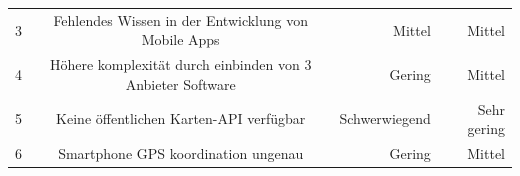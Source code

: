 \documentclass[a4paper,10pt,xetex]{article}
\begin{document}
\begin{longtable}[]{@{}rcrr@{}}
\begin{minipage}[t]{0.06\columnwidth}
3\strut
\end{minipage} & \begin{minipage}[t]{0.50\columnwidth}\centering\strut
Fehlendes Wissen in der Entwicklung von Mobile Apps\strut
\end{minipage} & \begin{minipage}[t]{0.14\columnwidth}\raggedleft\strut
Mittel\strut
\end{minipage} & \begin{minipage}[t]{0.19\columnwidth}\raggedleft\strut
Mittel\strut
\end{minipage}\tabularnewline
\begin{minipage}[t]{0.06\columnwidth}\raggedleft\strut
4\strut
\end{minipage} & \begin{minipage}[t]{0.50\columnwidth}\centering\strut
Höhere komplexität durch einbinden von 3 Anbieter Software\strut
\end{minipage} & \begin{minipage}[t]{0.14\columnwidth}\raggedleft\strut
Gering\strut
\end{minipage} & \begin{minipage}[t]{0.19\columnwidth}\raggedleft\strut
Mittel\strut
\end{minipage}\tabularnewline
\begin{minipage}[t]{0.06\columnwidth}\raggedleft\strut
5\strut
\end{minipage} & \begin{minipage}[t]{0.50\columnwidth}\centering\strut
Keine öffentlichen Karten-API verfügbar\strut
\end{minipage} & \begin{minipage}[t]{0.14\columnwidth}\raggedleft\strut
Schwerwiegend\strut
\end{minipage} & \begin{minipage}[t]{0.19\columnwidth}\raggedleft\strut
Sehr gering\strut
\end{minipage}\tabularnewline
\begin{minipage}[t]{0.06\columnwidth}\raggedleft\strut
6\strut
\end{minipage} & \begin{minipage}[t]{0.50\columnwidth}\centering\strut
Smartphone GPS koordination ungenau\strut
\end{minipage} & \begin{minipage}[t]{0.14\columnwidth}\raggedleft\strut
Gering\strut
\end{minipage} & \begin{minipage}[t]{0.19\columnwidth}\raggedleft\strut
Mittel\strut
\end{minipage}\tabularnewline
\bottomrule
\end{longtable}
\end{document}
